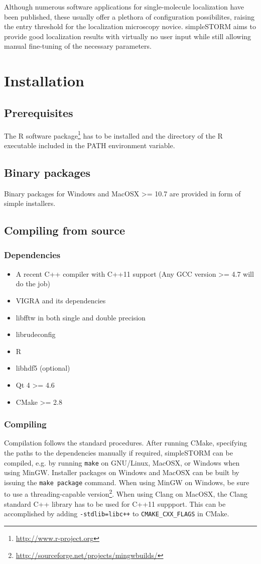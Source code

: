 \documentclass[a4paper,12pt,notitlepage]{report}
\begin{document}
Although numerous software applications for single-molecule localization have been published\citep{pmid23132113, pmid20431545, pmid22522657}, these usually offer a plethora of configuration possibilites, raising the entry threshold for the localization microscopy novice. simpleSTORM aims to provide good localization results with virtually no user input while still allowing manual fine-tuning of the necessary parameters.


\chapter{Installation}
\section{Prerequisites}
The R software package\footnote{\url{http://www.r-project.org}} has to be installed and the directory of the R executable included in the PATH environment variable.

\section{Binary packages}
Binary packages for Windows and MacOSX >= 10.7 are provided in form of simple installers.

\section{Compiling from source}
\subsection{Dependencies}
\begin{itemize}
    \item A recent C++ compiler with C++11 support (Any GCC version >= 4.7 will do the job)
    \item VIGRA and its dependencies
    \item libfftw in both single and double precision
    \item librudeconfig
    \item R
    \item libhdf5 (optional)
    \item Qt 4 >= 4.6
    \item CMake >= 2.8
\end{itemize}

\subsection{Compiling}
Compilation follows the standard procedures. After running CMake, specifying the paths to the dependencies manually if required, simpleSTORM can be compiled, e.g. by running \texttt{make} on GNU/Linux, MacOSX, or Windows when using MinGW. Installer packages on Windows and MacOSX can be built by issuing the \texttt{make package} command. When using MinGW on Windows, be sure to use a threading-capable version\footnote{\url{http://sourceforge.net/projects/mingwbuilds/}}. When using Clang on MacOSX, the Clang standard C++ library has to be used for C++11 suppport. This can be accomplished by adding \texttt{-stdlib=libc++} to \texttt{CMAKE\_CXX\_FLAGS} in CMake.
\end{document}
